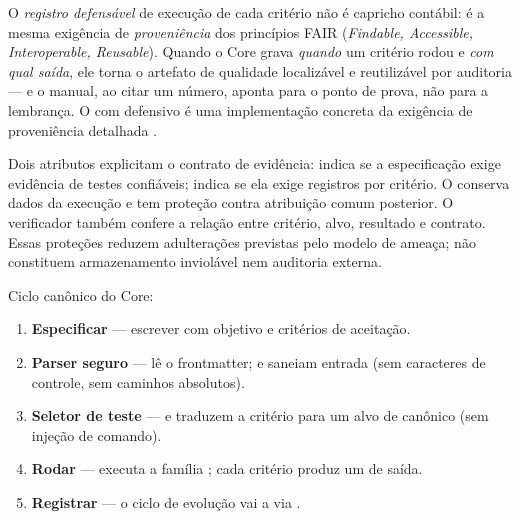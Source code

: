 \par\smallskip
O \emph{registro defensável} de execução de cada critério não é capricho
contábil: é a mesma exigência de \emph{proveniência} dos princípios FAIR
(\emph{Findable, Accessible, Interoperable, Reusable}). Quando o Core grava
\emph{quando} um critério rodou e \emph{com qual saída}, ele torna o artefato
de qualidade localizável e reutilizável por auditoria — e o manual, ao citar um
número, aponta para o ponto de prova, não para a lembrança. O
 com  defensivo é uma
implementação concreta da exigência de proveniência detalhada .\begin{funcao}
Dois atributos explicitam o contrato de evidência:
 indica se a especificação exige
evidência de testes confiáveis; 
indica se ela exige registros por critério. O 
conserva dados da execução e tem proteção contra atribuição comum posterior.
O verificador também confere a relação entre critério, alvo, resultado e
contrato. Essas proteções reduzem adulterações previstas pelo modelo de
ameaça; não constituem armazenamento inviolável nem auditoria externa.
\end{funcao}

\begin{processo}
Ciclo canônico do Core:
\begin{enumerate}[leftmargin=1.4em,itemsep=1pt]
\item \textbf{Especificar} — escrever  com objetivo e
critérios de aceitação.
\item \textbf{Parser seguro} —  lê o
frontmatter;  e
 saneiam entrada (sem caracteres de
controle, sem caminhos absolutos).
\item \textbf{Seletor de teste} —  e
 traduzem a critério para um alvo de
 canônico (sem injeção de comando).
\item \textbf{Rodar} —  executa a família
; cada critério produz um
 de saída.
\item \textbf{Registrar} — o ciclo de evolução vai a
 via .
\end{enumerate}
\end{processo}

